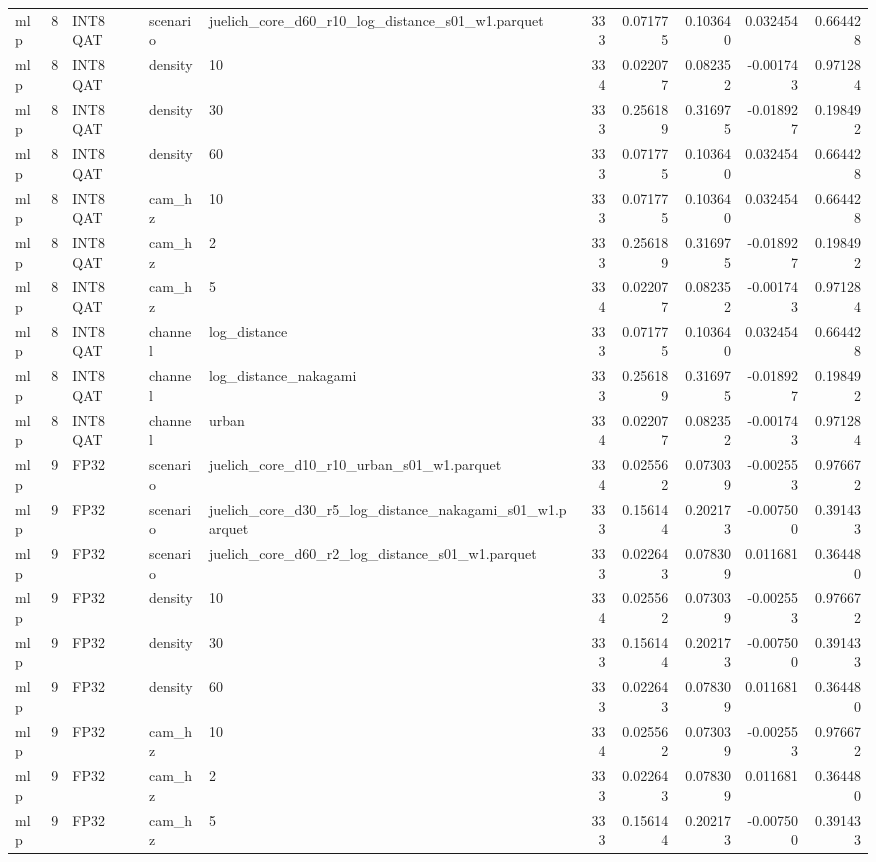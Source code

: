 \begin{tabular}{lrlllrrrrr}
mlp & 8 & INT8 QAT & scenario & juelich\_core\_d60\_r10\_log\_distance\_s01\_w1.parquet & 333 & 0.071775 & 0.103640 & 0.032454 & 0.664428 \\
mlp & 8 & INT8 QAT & density & 10 & 334 & 0.022077 & 0.082352 & -0.001743 & 0.971284 \\
mlp & 8 & INT8 QAT & density & 30 & 333 & 0.256189 & 0.316975 & -0.018927 & 0.198492 \\
mlp & 8 & INT8 QAT & density & 60 & 333 & 0.071775 & 0.103640 & 0.032454 & 0.664428 \\
mlp & 8 & INT8 QAT & cam\_hz & 10 & 333 & 0.071775 & 0.103640 & 0.032454 & 0.664428 \\
mlp & 8 & INT8 QAT & cam\_hz & 2 & 333 & 0.256189 & 0.316975 & -0.018927 & 0.198492 \\
mlp & 8 & INT8 QAT & cam\_hz & 5 & 334 & 0.022077 & 0.082352 & -0.001743 & 0.971284 \\
mlp & 8 & INT8 QAT & channel & log\_distance & 333 & 0.071775 & 0.103640 & 0.032454 & 0.664428 \\
mlp & 8 & INT8 QAT & channel & log\_distance\_nakagami & 333 & 0.256189 & 0.316975 & -0.018927 & 0.198492 \\
mlp & 8 & INT8 QAT & channel & urban & 334 & 0.022077 & 0.082352 & -0.001743 & 0.971284 \\
mlp & 9 & FP32 & scenario & juelich\_core\_d10\_r10\_urban\_s01\_w1.parquet & 334 & 0.025562 & 0.073039 & -0.002553 & 0.976672 \\
mlp & 9 & FP32 & scenario & juelich\_core\_d30\_r5\_log\_distance\_nakagami\_s01\_w1.parquet & 333 & 0.156144 & 0.202173 & -0.007500 & 0.391433 \\
mlp & 9 & FP32 & scenario & juelich\_core\_d60\_r2\_log\_distance\_s01\_w1.parquet & 333 & 0.022643 & 0.078309 & 0.011681 & 0.364480 \\
mlp & 9 & FP32 & density & 10 & 334 & 0.025562 & 0.073039 & -0.002553 & 0.976672 \\
mlp & 9 & FP32 & density & 30 & 333 & 0.156144 & 0.202173 & -0.007500 & 0.391433 \\
mlp & 9 & FP32 & density & 60 & 333 & 0.022643 & 0.078309 & 0.011681 & 0.364480 \\
mlp & 9 & FP32 & cam\_hz & 10 & 334 & 0.025562 & 0.073039 & -0.002553 & 0.976672 \\
mlp & 9 & FP32 & cam\_hz & 2 & 333 & 0.022643 & 0.078309 & 0.011681 & 0.364480 \\
mlp & 9 & FP32 & cam\_hz & 5 & 333 & 0.156144 & 0.202173 & -0.007500 & 0.391433 \\

\end{tabular}
